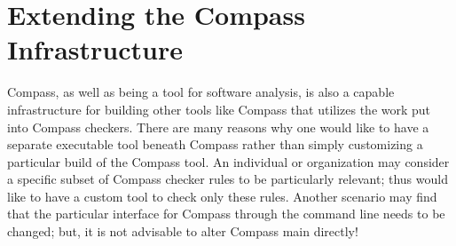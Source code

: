 %
%

%
%
%
%
%
%




\section{Extending the Compass Infrastructure}

Compass, as well as being a tool for software analysis, is also a capable
infrastructure for building other tools like Compass that utilizes the work
put into Compass checkers. There are many reasons why one would like to have 
a separate executable tool beneath Compass rather than simply customizing a
particular build of the Compass tool. An individual or organization may
consider a specific subset of Compass checker rules to be particularly
relevant; thus would like to have a custom tool to check only these rules.
Another scenario may find that the particular interface for Compass through
the command line needs to be changed; but, it is not advisable to alter
Compass main directly!

